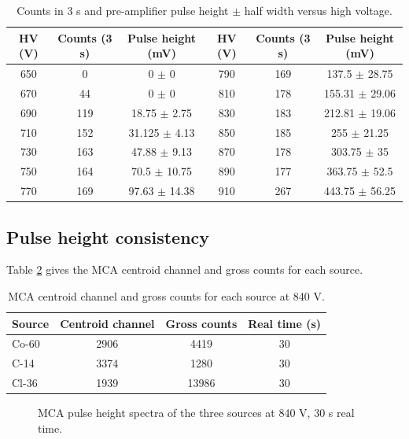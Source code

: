 \documentclass[12pt]{article}
\begin{document}
\begin{table}[!htbp]
\centering\small\setlength{\tabcolsep}{3pt}
\begin{tabular}{ccc|ccc}
\toprule
\textbf{HV (V)} & \textbf{Counts (3 s)} & \textbf{Pulse height (mV)} & \textbf{HV (V)} & \textbf{Counts (3 s)} & \textbf{Pulse height (mV)} \\
\midrule
650 & 0 & 0 $\pm$ 0 & 790 & 169 & 137.5 $\pm$ 28.75 \\
670 & 44 & 0 $\pm$ 0 & 810 & 178 & 155.31 $\pm$ 29.06 \\
690 & 119 & 18.75 $\pm$ 2.75 & 830 & 183 & 212.81 $\pm$ 19.06 \\
710 & 152 & 31.125 $\pm$ 4.13 & 850 & 185 & 255 $\pm$ 21.25 \\
730 & 163 & 47.88 $\pm$ 9.13 & 870 & 178 & 303.75 $\pm$ 35 \\
750 & 164 & 70.5 $\pm$ 10.75 & 890 & 177 & 363.75 $\pm$ 52.5 \\
770 & 169 & 97.63 $\pm$ 14.38 & 910 & 267 & 443.75 $\pm$ 56.25 \\
\bottomrule
\end{tabular}
\caption{Counts in 3 s and pre-amplifier pulse height $\pm$ half width versus high voltage.}
\label{tab:rawcc}
\end{table}

\subsection{Pulse height consistency}

Table \ref{tab:rawcons} gives the MCA centroid channel and gross counts for each source.

\begin{table}[!htbp]
\centering\small
\begin{tabular}{lccc}
\toprule
\textbf{Source} & \textbf{Centroid channel} & \textbf{Gross counts} & \textbf{Real time (s)} \\
\midrule
Co-60 & 2906 & 4419 & 30 \\
C-14 & 3374 & 1280 & 30 \\
Cl-36 & 1939 & 13986 & 30 \\
\bottomrule
\end{tabular}
\caption{MCA centroid channel and gross counts for each source at 840 V.}
\label{tab:rawcons}
\end{table}

\begin{figure}[!htbp]
\centering
{}
\caption{MCA pulse height spectra of the three sources at 840 V, 30 s real time.}
\label{fig:mca}
\end{figure}
\end{document}
